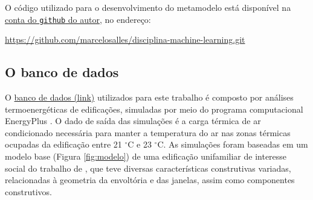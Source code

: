 \documentclass{article}
\begin{document}
O código utilizado para o desenvolvimento do metamodelo está disponível na \href{https://github.com/marcelosalles}{conta do \texttt{github} do autor}, no endereço:

\url{https://github.com/marcelosalles/disciplina-machine-learning.git}

\subsection{O banco de dados}

O \href{https://drive.google.com/uc?export=download&id=1XROGI9ZaUX711MjWiyEMv4U84lZFUcGW}{banco de dados (link)} utilizados para este trabalho é composto por análises termoenergéticas de edificações, simuladas por meio do programa computacional EnergyPlus \citep{EnergyPlus2018}. 
O dado de saída das simulações é a carga térmica de ar condicionado necessária para manter a temperatura do ar nas zonas térmicas ocupadas da edificação entre 21 $^{\circ}$C e 23 $^{\circ}$C.
As simulações foram baseadas em um modelo base (Figura \ref{fig:modelo}) de uma edificação unifamiliar de interesse social do trabalho de \citet{TRIANA2018}, que teve diversas características construtivas variadas, relacionadas à geometria da envoltória e das janelas, assim como componentes construtivos. 
\end{document}
